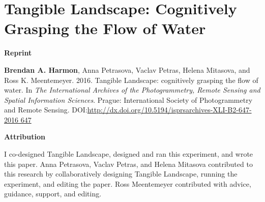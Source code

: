 \chapter{Tangible Landscape: Cognitively Grasping the Flow of Water}
\label{chap-three}

\textbf{Reprint}

\textbf{Brendan A. Harmon}, Anna Petrasova, Vaclav Petras, Helena Mitasova, and Ross K. Meentemeyer. 2016. Tangible Landscape: cognitively grasping the flow of water. In \emph{The International Archives of the Photogrammetry, Remote Sensing and Spatial Information Sciences}. Prague: International Society of Photogrammetry and Remote Sensing. DOI:\url{http://dx.doi.org/10.5194/isprsarchives-XLI-B2-647-2016 647}

\textbf{Attribution}

I co-designed Tangible Landscape,
designed and ran this experiment,
and wrote this paper.
%
Anna Petrasova, Vaclav Petras, and Helena Mitasova
contributed to this research by
collaboratively designing Tangible Landscape,
running the experiment,
and editing the paper.
%
Ross Meentemeyer
contributed with advice, guidance, support, and editing.

\vfil
\pagebreak

%